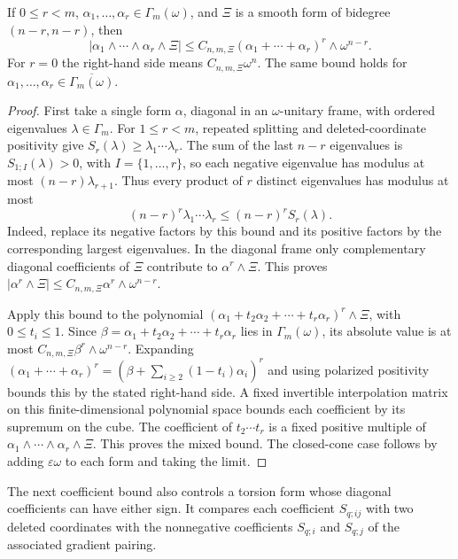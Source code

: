 \begin{lemma}\label{hessian:absolute-mixed-forms}
If $0\leq r<m$, $\alpha_1,\ldots,\alpha_r\in\Gamma_m(\omega)$,
and $\Xi$ is a smooth form of bidegree $(n-r,n-r)$, then
\[
 |\alpha_1\wedge\cdots\wedge\alpha_r\wedge\Xi|
 \leq C_{n,m,\Xi}(\alpha_1+\cdots+\alpha_r)^r\wedge\omega^{n-r}.
\]
For $r=0$ the right-hand side means $C_{n,m,\Xi}\omega^n$. The same
bound holds for $\alpha_1,\ldots,\alpha_r\in\overline{\Gamma_m(\omega)}$.
\end{lemma}
\begin{proof}
First take a single form $\alpha$, diagonal in an $\omega$-unitary frame,
with ordered eigenvalues $\lambda\in\Gamma_m$.
For $1\leq r<m$, repeated splitting and deleted-coordinate positivity
give $S_r(\lambda)\geq\lambda_1\cdots\lambda_r$.
The sum of the last $n-r$ eigenvalues is $S_{1;I}(\lambda)>0$, with
$I=\{1,\ldots,r\}$, so each negative
eigenvalue has modulus at most $(n-r)\lambda_{r+1}$.
Thus every product of $r$ distinct eigenvalues has modulus at most
\[
 (n-r)^r\lambda_1\cdots\lambda_r\leq(n-r)^r S_r(\lambda).
\]
Indeed, replace its negative factors by this bound and its positive
factors by the corresponding largest eigenvalues. In the diagonal frame
only complementary diagonal coefficients of $\Xi$ contribute to
$\alpha^r\wedge\Xi$. This proves
$|\alpha^r\wedge\Xi|\leq C_{n,m,\Xi}\alpha^r\wedge\omega^{n-r}$.

Apply this bound to the polynomial
$(\alpha_1+t_2\alpha_2+\cdots+t_r\alpha_r)^r\wedge\Xi$,
with $0\leq t_i\leq1$. Since
$\beta=\alpha_1+t_2\alpha_2+\cdots+t_r\alpha_r$ lies in
$\Gamma_m(\omega)$, its absolute value is at most
$C_{n,m,\Xi}\beta^r\wedge\omega^{n-r}$. Expanding
$(\alpha_1+\cdots+\alpha_r)^r=(\beta+\sum_{i\geq2}(1-t_i)\alpha_i)^r$
and using polarized positivity bounds this by the stated right-hand side.
A fixed invertible interpolation matrix on this finite-dimensional
polynomial space bounds each coefficient by its supremum on the cube.
The coefficient of $t_2\cdots t_r$ is a fixed positive multiple of
$\alpha_1\wedge\cdots\wedge\alpha_r\wedge\Xi$.
This proves the mixed bound. The closed-cone case follows by adding
$\varepsilon\omega$ to each form and taking the limit.
\end{proof}

The next coefficient bound also controls a torsion form whose
diagonal coefficients can have either sign. It compares each
coefficient $S_{q;ij}$ with two deleted coordinates with the
nonnegative coefficients $S_{q;i}$ and $S_{q;j}$ of the associated
gradient pairing.

